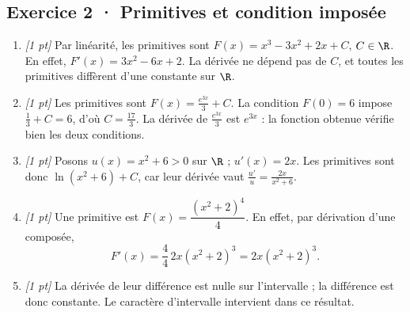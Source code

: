 \subsection*{Exercice 2 · Primitives et condition imposée}\begin{enumerate}

\item \textit{[1 pt]} Par linéarité, les primitives sont $F(x)=x^3-3x^2+2x+C$, $C\in\R$. En effet, $F'(x)=3x^2-6x+2$. La dérivée ne dépend pas de $C$, et toutes les primitives diffèrent d'une constante sur $\R$.

\item \textit{[1 pt]} Les primitives sont $F(x)=\frac{e^{3x}}{3}+C$. La condition $F(0)=6$ impose $\frac{1}{3}+C=6$, d'où $C=\frac{17}{3}$. La dérivée de $\frac{e^{3x}}{3}$ est $e^{3x}$ : la fonction obtenue vérifie bien les deux conditions.

\item \textit{[1 pt]} Posons $u(x)=x^2+6>0$ sur $\R$ ; $u'(x)=2x$. Les primitives sont donc $\ln(x^2+6)+C$, car leur dérivée vaut $\frac{u'}{u}=\frac{2x}{x^2+6}$.

\item \textit{[1 pt]} Une primitive est $F(x)=\dfrac{(x^2+2)^{4}}{4}$. En effet, par dérivation d'une composée,
\[F'(x)=\frac{4}{4}\,2x(x^2+2)^{3}=2x(x^2+2)^{3}.\]

\item \textit{[1 pt]} La dérivée de leur différence est nulle sur l'intervalle ; la différence est donc constante. Le caractère d'intervalle intervient dans ce résultat.

\end{enumerate}

